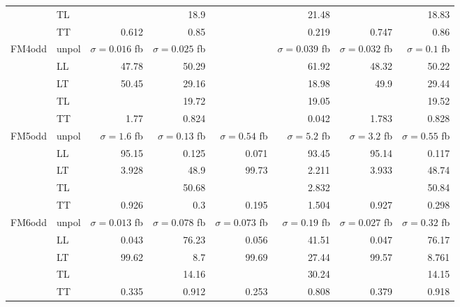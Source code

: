 \begin{table}[h]
{\begin{tabular}{llrrrrrr}
 & TL &  & \num{18.9} &  & \num{21.48} &  & \num{18.83} \\
 & TT & \num{0.612} & \num{0.85} &  & \num{0.219} & \num{0.747} & \num{0.86} \\
\midrule
\multirow{5}{*}{FM4odd}
 & unpol & $\sigma = \num{0.016}$ fb & $\sigma = \num{0.025}$ fb &  & $\sigma = \num{0.039}$ fb & $\sigma = \num{0.032}$ fb & $\sigma = \num{0.1}$ fb \\
 & LL & \num{47.78} & \num{50.29} &  & \num{61.92} & \num{48.32} & \num{50.22} \\
 & LT & \num{50.45} & \num{29.16} &  & \num{18.98} & \num{49.9} & \num{29.44} \\
 & TL &  & \num{19.72} &  & \num{19.05} &  & \num{19.52} \\
 & TT & \num{1.77} & \num{0.824} &  & \num{0.042} & \num{1.783} & \num{0.828} \\
\midrule
\multirow{5}{*}{FM5odd}
 & unpol & $\sigma = \num{1.6}$ fb & $\sigma = \num{0.13}$ fb & $\sigma = \num{0.54}$ fb & $\sigma = \num{5.2}$ fb & $\sigma = \num{3.2}$ fb & $\sigma = \num{0.55}$ fb \\
 & LL & \num{95.15} & \num{0.125} & \num{0.071} & \num{93.45} & \num{95.14} & \num{0.117} \\
 & LT & \num{3.928} & \num{48.9} & \num{99.73} & \num{2.211} & \num{3.933} & \num{48.74} \\
 & TL &  & \num{50.68} &  & \num{2.832} &  & \num{50.84} \\
 & TT & \num{0.926} & \num{0.3} & \num{0.195} & \num{1.504} & \num{0.927} & \num{0.298} \\
\midrule
\multirow{5}{*}{FM6odd}
 & unpol & $\sigma = \num{0.013}$ fb & $\sigma = \num{0.078}$ fb & $\sigma = \num{0.073}$ fb & $\sigma = \num{0.19}$ fb & $\sigma = \num{0.027}$ fb & $\sigma = \num{0.32}$ fb \\
 & LL & \num{0.043} & \num{76.23} & \num{0.056} & \num{41.51} & \num{0.047} & \num{76.17} \\
 & LT & \num{99.62} & \num{8.7} & \num{99.69} & \num{27.44} & \num{99.57} & \num{8.761} \\
 & TL &  & \num{14.16} &  & \num{30.24} &  & \num{14.15} \\
 & TT & \num{0.335} & \num{0.912} & \num{0.253} & \num{0.808} & \num{0.379} & \num{0.918} \\
\bottomrule
\end{tabular}
}%
\end{table}
\newpage
